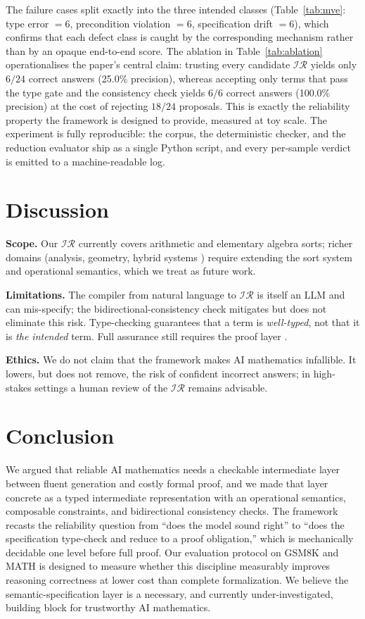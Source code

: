 \documentclass[11pt]{article}
\newcommand{\IR}{\ensuremath{\mathcal{IR}}}
\begin{document}
The failure cases split exactly into the three intended classes (Table~\ref{tab:mve}:
type error $=6$, precondition violation $=6$, specification drift $=6$), which
confirms that each defect class is caught by the corresponding mechanism
rather than by an opaque end-to-end score. The ablation in
Table~\ref{tab:ablation} operationalises the paper's central claim: trusting
every candidate \IR{} yields only $6/24$ correct answers (25.0\% precision),
whereas accepting only terms that pass the type gate and the consistency check
yields $6/6$ correct answers (100.0\% precision) at the cost of rejecting
$18/24$ proposals. This is exactly the reliability property the framework is
designed to provide, measured at toy scale. The experiment is fully
reproducible: the corpus, the deterministic checker, and the reduction
evaluator ship as a single Python script, and every per-sample verdict is
emitted to a machine-readable log.

\section{Discussion}
\label{sec:discussion}

\textbf{Scope.} Our \IR{} currently covers arithmetic and elementary algebra
sorts; richer domains (analysis, geometry, hybrid systems
\citep{fulton2015keymaera}) require extending the sort system and operational
semantics, which we treat as future work.

\textbf{Limitations.} The compiler from natural language to \IR{} is itself an
LLM and can mis-specify; the bidirectional-consistency check mitigates but does
not eliminate this risk. Type-checking guarantees that a term is
\emph{well-typed}, not that it is \emph{the intended} term. Full assurance
still requires the proof layer \citep{sozeau2019coqcoqcorrect}.

\textbf{Ethics.} We do not claim that the framework makes AI mathematics
infallible. It lowers, but does not remove, the risk of confident incorrect
answers; in high-stakes settings a human review of the \IR{} remains advisable.

\section{Conclusion}
\label{sec:conclusion}

We argued that reliable AI mathematics needs a checkable intermediate layer
between fluent generation and costly formal proof, and we made that layer
concrete as a typed intermediate representation with an operational semantics,
composable constraints, and bidirectional consistency checks. The framework
recasts the reliability question from ``does the model sound right'' to ``does
the specification type-check and reduce to a proof obligation,'' which is
mechanically decidable one level before full proof. Our evaluation protocol on
GSM8K and MATH is designed to measure whether this discipline measurably
improves reasoning correctness at lower cost than complete formalization. We
believe the semantic-specification layer is a necessary, and currently
under-investigated, building block for trustworthy AI mathematics.



\end{document}
